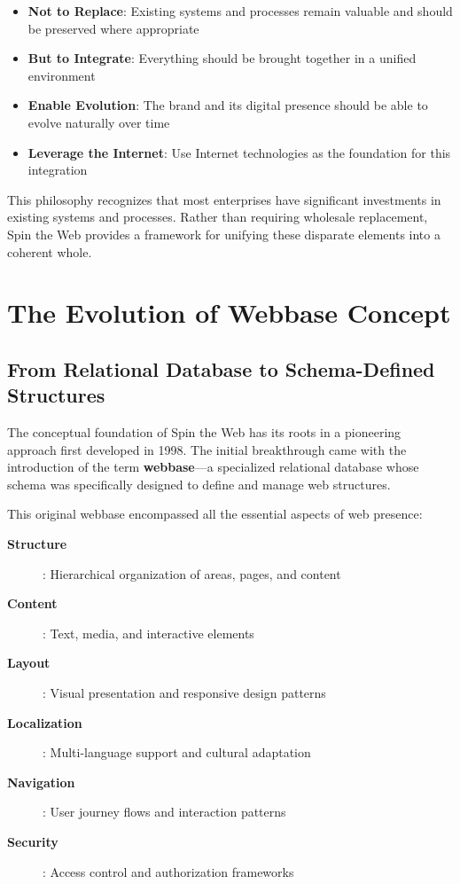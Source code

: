 \begin{itemize}
\item \textbf{Not to Replace}: Existing systems and processes remain valuable and should be preserved where appropriate
\item \textbf{But to Integrate}: Everything should be brought together in a unified environment
\item \textbf{Enable Evolution}: The brand and its digital presence should be able to evolve naturally over time
\item \textbf{Leverage the Internet}: Use Internet technologies as the foundation for this integration
\end{itemize}

This philosophy recognizes that most enterprises have significant investments in existing systems and processes. Rather than requiring wholesale replacement, Spin the Web provides a framework for unifying these disparate elements into a coherent whole.

\section{The Evolution of Webbase Concept}

\subsection{From Relational Database to Schema-Defined Structures}

The conceptual foundation of Spin the Web has its roots in a pioneering approach first developed in 1998. The initial breakthrough came with the introduction of the term \textbf{webbase}—a specialized relational database whose schema was specifically designed to define and manage web structures.

This original webbase encompassed all the essential aspects of web presence:

\begin{description}
\item[\textbf{Structure}]: Hierarchical organization of areas, pages, and content
\item[\textbf{Content}]: Text, media, and interactive elements
\item[\textbf{Layout}]: Visual presentation and responsive design patterns
\item[\textbf{Localization}]: Multi-language support and cultural adaptation
\item[\textbf{Navigation}]: User journey flows and interaction patterns
\item[\textbf{Security}]: Access control and authorization frameworks
\end{description}

